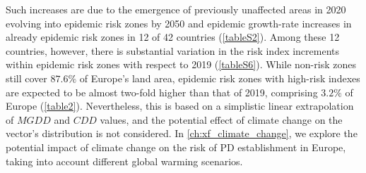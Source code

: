     \begin{table}[H]
        \centering
        \caption[Extrapolated shifts in risk areas for Pierce's disease in
            Europe in 2050]{\textbf{Shifts in risk areas for Pierce's disease
                in Europe projected for 2050 under a $R_0$ = 5 scenario.} The
            model was run
            assuming the same
            homogeneous spatial distribution of the vector for the whole
            period.}
        \label{table2}
    \end{table}

    Such increases are due to the
    emergence of previously unaffected areas in 2020 evolving into
    epidemic risk zones by 2050 and epidemic growth-rate increases in already
    epidemic risk zones in 12 of 42 countries (\cref{tableS2}). Among
    these 12 countries, however, there is substantial variation in the risk
    index increments within epidemic risk zones with respect to 2019
    (\cref{tableS6}). While non-risk zones still cover $87.6\%$ of
    Europe's land area, epidemic risk zones with high-risk indexes are expected
    to be almost two-fold higher than that of 2019, comprising $3.2\%$ of
    Europe (\cref{table2}). Nevertheless, this is based on a simplistic
    linear extrapolation of $MGDD$ and $CDD$ values, and the potential effect
    of
    climate change on the vector's distribution is not considered. In
    \cref{ch:xf_climate_change}, we explore the potential impact of climate
    change on the risk of PD establishment in Europe, taking into account
    different global warming scenarios.

